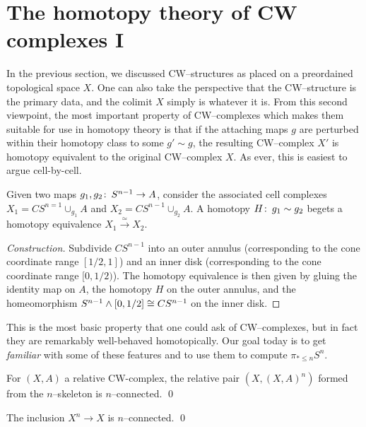 \section{The homotopy theory of CW complexes I}

In the previous section, we discussed CW--structures as placed on a preordained topological space $X$.
One can also take the perspective that the CW--structure is the primary data, and the colimit $X$ simply is whatever it is.
From this second viewpoint, the most important property of CW--complexes which makes them suitable for use in homotopy theory is that if the attaching maps $g$ are perturbed within their homotopy class to some $g' \sim g$, the resulting CW--complex $X'$ is homotopy equivalent to the original CW--complex $X$.
As ever, this is easiest to argue cell-by-cell.

\begin{lemma}
Given two maps $g_1, g_2\colon\thinspace S^{n-1} \to A$, consider the associated cell complexes $X_1 = CS^{n=1} \cup_{g_1} A$ and $X_2 = CS^{n-1} \cup_{g_2} A$.
A homotopy $H\colon\thinspace g_1 \sim g_2$ begets a homotopy equivalence $X_1 \xrightarrow{\simeq} X_2$.
\end{lemma}
\begin{proof}[Construction] 
Subdivide $CS^{n-1}$ into an outer annulus (corresponding to the cone coordinate range $[1/2, 1]$) and an inner disk (corresponding to the cone coordinate range $[0, 1/2)$).
The homotopy equivalence is then given by gluing the identity map on $A$, the homotopy $H$ on the outer annulus, and the homeomorphism $S^{n-1} \wedge [0, 1/2] \cong CS^{n-1}$ on the inner disk.
\end{proof}

This is the most basic property that one could ask of CW--complexes, but in fact they are remarkably well-behaved homotopically.  Our goal today is to get \emph{familiar} with some of these features and to use them to compute $\pi_{* \le n} S^n$.

\begin{lemma}%
For $(X, A)$ a relative CW-complex, the relative pair $(X, (X, A)^n)$ formed from the $n$--skeleton is $n$--connected. \qed
\end{lemma}

\begin{corollary}\label{XnIntoXIsNConnected}%
The inclusion $X^n \to X$ is $n$--connected. \qed
\end{corollary}

